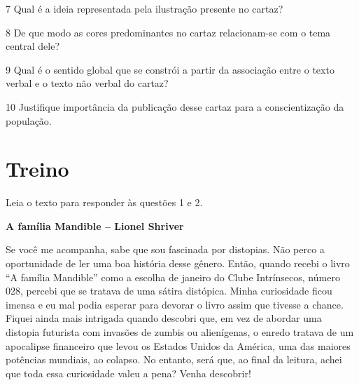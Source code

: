 \num{7} Qual é a ideia representada pela ilustração presente no cartaz?


\pagebreak

\num{8} De que modo as cores predominantes no cartaz relacionam-se com o
tema central dele?


\num{9} Qual é o sentido global que se constrói a partir da associação
entre o texto verbal e o texto não verbal do cartaz?


\num{10} Justifique importância da publicação desse cartaz para a
conscientização da população.


\section*{Treino}

Leia o texto para responder às questões 1 e 2.

\begin{myquote}
\centering\textbf{A família Mandible -- Lionel Shriver}


Se você me acompanha, sabe que sou fascinada por distopias. Não perco a
oportunidade de ler uma boa história desse gênero. Então, quando recebi
o livro ``A família Mandible'' como a escolha de janeiro do Clube
Intrínsecos, número 028, percebi que se tratava de uma sátira distópica.
Minha curiosidade ficou imensa e eu mal podia esperar para devorar o
livro assim que tivesse a chance. Fiquei ainda mais intrigada quando
descobri que, em vez de abordar uma distopia futurista com invasões de
zumbis ou alienígenas, o enredo tratava de um apocalipse financeiro que
levou os Estados Unidos da América, uma das maiores potências mundiais,
ao colapso. No entanto, será que, ao final da leitura, achei que toda
essa curiosidade valeu a pena? Venha descobrir!

\end{myquote}

